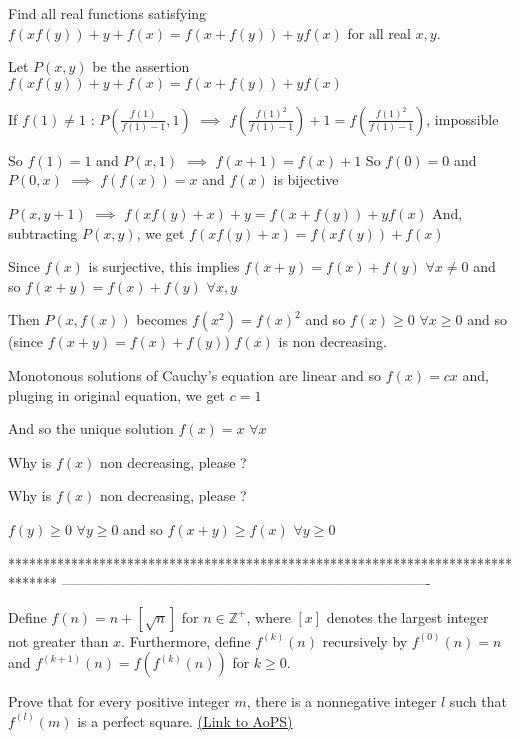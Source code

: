 \begin{solution}
	\begin{tcolorbox}Find all real functions satisfying $f(xf(y))+y+f(x)=f(x+f(y))+yf(x)$ for all real $x,y$.\end{tcolorbox}
Let $P(x,y)$ be the assertion $f(xf(y))+y+f(x)=f(x+f(y))+yf(x)$

If $f(1)\ne 1$ : $P(\frac{f(1)}{f(1)-1},1)$ $\implies$ $f(\frac{f(1)^2}{f(1)-1})+1=f(\frac{f(1)^2}{f(1)-1})$, impossible

So $f(1)=1$ and $P(x,1)$ $\implies$ $f(x+1)=f(x)+1$
So $f(0)=0$ and $P(0,x)$ $\implies$ $f(f(x))=x$ and $f(x)$ is bijective

$P(x,y+1)$ $\implies$ $f(xf(y)+x)+y=f(x+f(y))+yf(x)$
And, subtracting $P(x,y)$, we get $f(xf(y)+x)=f(xf(y))+f(x)$

Since $f(x)$ is surjective, this implies $f(x+y)=f(x)+f(y)$ $\forall x\ne 0$ and so $f(x+y)=f(x)+f(y)$ $\forall x,y$

Then $P(x,f(x))$ becomes $f(x^2)=f(x)^2$ and so $f(x)\ge 0$ $\forall x\ge 0$ and so (since $f(x+y)=f(x)+f(y)$) $f(x)$ is non decreasing.

Monotonous solutions of Cauchy's equation are linear and so $f(x)=cx$ and, pluging in original equation, we get $c=1$

And so the unique solution $\boxed{f(x)=x}$ $\forall x$
\end{solution}



\begin{solution}
	Why is $f(x)$ non decreasing, please ?
\end{solution}



\begin{solution}
	\begin{tcolorbox}Why is $f(x)$ non decreasing, please ?\end{tcolorbox}
$f(y)\ge 0$ $\forall y\ge 0$ and so $f(x+y)\ge f(x)$ $\forall y\ge 0$
\end{solution}
*******************************************************************************
-------------------------------------------------------------------------------

\begin{problem}
	Define $f(n)=n+[\sqrt{n}]$ for $n\in\mathbb{Z}^+$, where $[x]$ denotes the largest integer not greater than $x$.
Furthermore, define $f^{(k)}(n)$ recursively by $f^{(0)}(n)=n$ and $f^{(k+1)}(n)=f\left(f^{(k)}(n)\right)$ for $k\ge 0$.

Prove that for every positive integer $m$, there is a nonnegative integer $l$ such that $f^{(l)}(m)$ is a perfect square.
	\flushright \href{https://artofproblemsolving.com/community/c6h483540}{(Link to AoPS)}
\end{problem}



